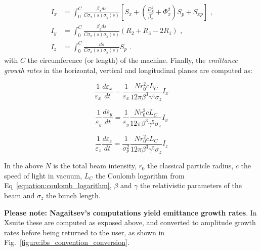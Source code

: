 \begin{equation}
    \begin{aligned}
        I_x &= \int_0^C \frac{\beta_x ds}{C \sigma_x(s) \sigma_y(s)} \left[S_x + \left( \frac{D_x^{2}}{\beta_x^{2}} + \Phi_x^{2} \right) S_p + S_{xp} \right] \text{ ,} \\
        I_y &= \int_0^C \frac{\beta_y ds}{C \sigma_x(s) \sigma_y(s)} \left(R_2 + R_3 - 2 R_1\right) \text{ ,} \\
        I_z &= \int_0^C \frac{ds}{C \sigma_x(s) \sigma_y(s)} S_p \text{ .}
    \end{aligned}
    \label{equation:nagaitsev_integrals}
\end{equation}
with \(C\) the circumference (or length) of the machine.
Finally, the \textit{emittance growth rates} in the horizontal, vertical and longitudinal planes are computed as:

\begin{equation}
    \boxed{\frac{1}{\varepsilon_x} \frac{d \varepsilon_x}{dt} = \frac{1}{\varepsilon_x} \frac{N r_0^{2} c L_C}{12 \pi \beta^3 \gamma^5 \sigma_z} I_x}
    \label{equation:nagaitsev_tx}
\end{equation}

\begin{equation}
    \boxed{\frac{1}{\varepsilon_y} \frac{d \varepsilon_y}{dt} = \frac{1}{\varepsilon_y} \frac{N r_0^{2} c L_C}{12 \pi \beta^3 \gamma^5 \sigma_z} I_y}
    \label{equation:nagaitsev_ty}
\end{equation}

\begin{equation}
    \boxed{\frac{1}{\varepsilon_z} \frac{d \varepsilon_z}{dt} = \frac{1}{\sigma_p^{2}} \frac{N r_0^{2} c L_C}{12 \pi \beta^3 \gamma^5 \sigma_z} I_z}
    \label{equation:nagaitsev_tz}
\end{equation}

In the above \(N\) is the total beam intensity, \(r_0\) the classical particle radius, \(c\) the speed of light in vacuum, \(L_C\) the Coulomb logarithm from Eq~\eqref{equation:coulomb_logarithm}, \(\beta\) and \(\gamma\) the relativistic parameters of the beam and \(\sigma_z\) the bunch length.
\newline

\textbf{Please note: Nagaitsev's computations yield emittance growth rates}.
In Xsuite these are computed as exposed above, and converted to amplitude growth rates before being returned to the user, as shown in Fig.~\ref{figure:ibs_convention_conversion}.
\newline

